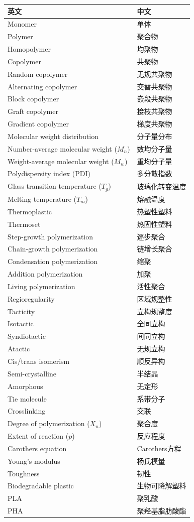 \documentclass[12pt,a4paper]{ctexart}
\begin{document}
\begin{longtable}{p{5cm}p{5cm}}
\toprule
\textbf{英文} & \textbf{中文} \\
\midrule
Monomer & 单体 \\
Polymer & 聚合物 \\
Homopolymer & 均聚物 \\
Copolymer & 共聚物 \\
Random copolymer & 无规共聚物 \\
Alternating copolymer & 交替共聚物 \\
Block copolymer & 嵌段共聚物 \\
Graft copolymer & 接枝共聚物 \\
Gradient copolymer & 梯度共聚物 \\
Molecular weight distribution & 分子量分布 \\
Number-average molecular weight ($M_n$) & 数均分子量 \\
Weight-average molecular weight ($M_w$) & 重均分子量 \\
Polydispersity index (PDI) & 多分散指数 \\
Glass transition temperature ($T_g$) & 玻璃化转变温度 \\
Melting temperature ($T_m$) & 熔融温度 \\
Thermoplastic & 热塑性塑料 \\
Thermoset & 热固性塑料 \\
Step-growth polymerization & 逐步聚合 \\
Chain-growth polymerization & 链增长聚合 \\
Condensation polymerization & 缩聚 \\
Addition polymerization & 加聚 \\
Living polymerization & 活性聚合 \\
Regioregularity & 区域规整性 \\
Tacticity & 立构规整度 \\
Isotactic & 全同立构 \\
Syndiotactic & 间同立构 \\
Atactic & 无规立构 \\
Cis/trans isomerism & 顺反异构 \\
Semi-crystalline & 半结晶 \\
Amorphous & 无定形 \\
Tie molecule & 系带分子 \\
Crosslinking & 交联 \\
Degree of polymerization ($X_n$) & 聚合度 \\
Extent of reaction ($p$) & 反应程度 \\
Carothers equation & Carothers方程 \\
Young's modulus & 杨氏模量 \\
Toughness & 韧性 \\
Biodegradable plastic & 生物可降解塑料 \\
PLA & 聚乳酸 \\
PHA & 聚羟基脂肪酸酯 \\
\bottomrule
\end{longtable}
\end{document}
